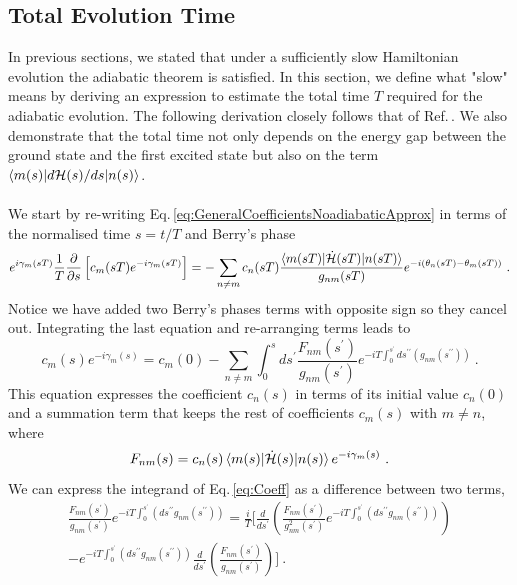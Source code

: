 \subsection{Total Evolution Time}
In previous sections, we stated that under a sufficiently slow Hamiltonian evolution the adiabatic theorem is satisfied. In this section, we define what "slow" means by deriving an expression to estimate the total time $T$ required for the adiabatic evolution. The following derivation closely follows that of Ref.\,\cite{Sarandy2005AdiabaticSystems}. We also demonstrate that the total time not only depends on the energy gap between the ground state and the first excited state but also on the term $\braket{m(s)|d\mathcal{H}(s)/ds|n(s)}$.\\\\
We start by re-writing Eq.\,\eqref{eq:GeneralCoefficientsNoadiabaticApprox} in terms of the normalised time $s = t/T$ and Berry's phase
\begin{equation}
    e^{i\gamma_{m}(sT)}\frac{1}{T}\frac{\partial }{\partial s}\left[c_{m}(sT)e^{-i\gamma_{m}(sT)}\right] = -\sum_{n\neq m} c_{n}(sT) \frac{\braket{m(sT)|\dot{\mathcal{H}}(sT)|n(sT)}}{g_{nm}(sT)}e^{-i\left(\theta_{n}(sT) - \theta_{m}(sT)\right)}\ .
\end{equation}
Notice we have added two Berry's phases terms with opposite sign so they cancel out. Integrating the last equation and re-arranging terms leads to
\begin{equation}
\label{eq:Coeff}
    c_{m}(s)e^{-i\gamma_{m}(s)} = c_{m}(0) - \sum_{n\neq m}\int_{0}^{s} ds^{\prime}\frac{F_{nm}(s^{\prime})}{g_{nm}(s^{\prime})}e^{-iT\int_{0}^{s^{\prime}}ds^{\prime\prime}\left(g_{nm}(s^{\prime\prime})\right)}\ .
\end{equation}
This equation expresses the coefficient $c_{n}(s)$ in terms of its initial value $c_{n}(0)$ and a summation term that keeps the rest of coefficients $c_{m}(s)$ with $m\neq n$, where
\begin{equation}
\label{eq:Fnm}
    F_{nm}(s) = c_{n}(s)\braket{m(s)|\dot{\mathcal{H}}(s)|n(s)} e^{-i\gamma_{m}(s)}\ .
\end{equation}
We can express the integrand of Eq.\,\eqref{eq:Coeff} as a difference between two terms,
\begin{align}
\frac{F_{nm}(s^{\prime})}{g_{nm}(s^{\prime})} e^{-iT\int_{0}^{s^{\prime}}\left(ds^{\prime \prime}g_{nm}(s^{\prime\prime}) \right)}= \frac{i}{T}\Biggl[\frac{d}{ds^{\prime}}\left(\frac{F_{nm}(s^{\prime})}{g^{2}_{nm}(s^{\prime})}e^{-iT\int_{0}^{s^{\prime}}\left(ds^{\prime \prime}g_{nm}(s^{\prime\prime}) \right)}\right)\\
 - e^{-iT\int_{0}^{s^{\prime}}\left(ds^{\prime \prime}g_{nm}(s^{\prime\prime}) \right)} \frac{d}{ds^{\prime}}\left(\frac{F_{nm}(s^{\prime})}{g_{nm}(s^{\prime})}\right)\Biggr]\ .
 \end{align}
